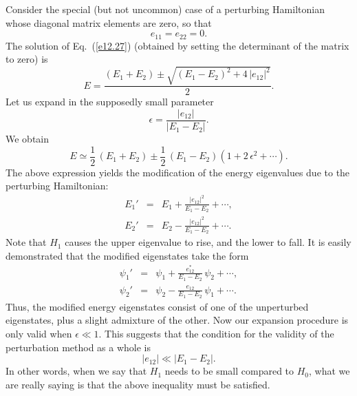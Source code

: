 Consider the special (but not uncommon) case of a perturbing Hamiltonian
whose diagonal matrix elements are zero, so that
\begin{equation}
e_{11}= e_{22} = 0.
\end{equation}
The solution of  Eq.~(\ref{e12.27}) (obtained by setting
the determinant of the matrix to zero) is
\begin{equation}
E = \frac{(E_1+E_2)\pm\sqrt{(E_1-E_2)^2 + 4\,|e_{12}|^2}}
{2}.
\end{equation}
Let us expand in the supposedly small parameter
\begin{equation}
\epsilon = \frac{|e_{12}|}{|E_1-E_2|}.
\end{equation}
We obtain
\begin{equation}
E \simeq \frac{1}{2}\,(E_1+E_2) \pm \frac{1}{2}\,(E_1-E_2)(1+2\,\epsilon^2+\cdots).
\end{equation}
The above expression yields the modification of the
energy eigenvalues due to the perturbing Hamiltonian:
\begin{eqnarray}
E_1' &=& E_1 + \frac{|e_{12}|^2}{E_1-E_2}+ \cdots,\\[0.5ex]
E_2' &=& E_2 - \frac{|e_{12}|^2}{E_1-E_2}+\cdots.
\end{eqnarray}
Note that $H_1$ causes the upper eigenvalue to rise, and the lower to fall.
It is easily demonstrated that the modified eigenstates take the form
\begin{eqnarray}
\psi_1' &=&\psi_1+ \frac{e_{12}^\ast}{E_1-E_2}\,\psi_2+ \cdots,\\[0.5ex]
\psi_2'&=& \psi_2 - \frac{e_{12}}{E_1-E_2}\,\psi_1+ \cdots.
\end{eqnarray}
Thus, the modified energy eigenstates consist of one of the
unperturbed eigenstates, plus a slight admixture of the other.
Now our expansion procedure is only valid when $\epsilon\ll 1$. 
This suggests that the condition for the validity of the perturbation
method as a whole is
\begin{equation}
|e_{12}|\ll |E_1-E_2|.
\end{equation}
In other words, when we say that $H_1$ needs to be small compared to
$H_0$, what we are really saying is that the above inequality must be
satisfied.

